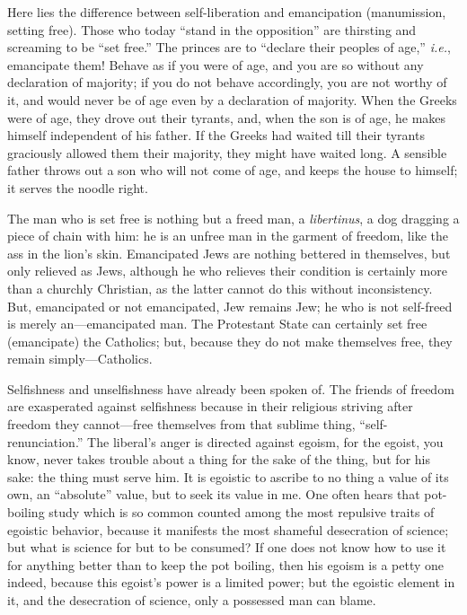Here lies the difference between self-liberation and emancipation 
(manumission, setting free). Those who today ``stand in the opposition'' are 
thirsting and screaming to be ``set free.'' The princes are to ``declare 
their peoples of age,'' \textit{i.e.}, emancipate them! Behave as if you 
were of age, and you are so without any declaration of majority; if you do not 
behave accordingly, you are not worthy of it, and would never be of age even 
by a declaration of majority. When the Greeks were of age, they drove out 
their tyrants, and, when the son is of age, he makes himself independent of 
his father. If the Greeks had waited till their tyrants graciously allowed 
them their majority, they might have waited long. A sensible father throws out 
a son who will not come of age, and keeps the house to himself; it serves the 
noodle right.

The man who is set free is nothing but a freed man, a \textit{libertinus}, a 
dog dragging a piece of chain with him: he is an unfree man in the garment of 
freedom, like the ass in the lion's skin. Emancipated Jews are nothing 
bettered in themselves, but only relieved as Jews, although he who relieves 
their condition is certainly more than a churchly Christian, as the latter 
cannot do this without inconsistency. But, emancipated or not emancipated, Jew 
remains Jew; he who is not self-freed is merely an---emancipated man. The 
Protestant State can certainly set free (emancipate) the Catholics; but, 
because they do not make themselves free, they remain simply---Catholics.

Selfishness and unselfishness have already been spoken of. The friends of 
freedom are exasperated against selfishness because in their religious 
striving after freedom they cannot---free themselves from that sublime thing, 
``self-renunciation.'' The liberal's anger is directed against egoism, for 
the egoist, you know, never takes trouble about a thing for the sake of the 
thing, but for his sake: the thing must serve him. It is egoistic to ascribe 
to no thing a value of its own, an ``absolute'' value, but to seek its value 
in me. One often hears that pot-boiling study which is so common counted among 
the most repulsive traits of egoistic behavior, because it manifests the most 
shameful desecration of science; but what is science for but to be consumed? 
If one does not know how to use it for anything better than to keep the pot 
boiling, then his egoism is a petty one indeed, because this egoist's power is 
a limited power; but the egoistic element in it, and the desecration of 
science, only a possessed man can blame.

